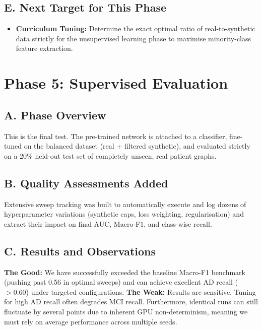\documentclass[11pt, a4paper]{article}
\begin{document}
\subsection{E. Next Target for This Phase}
\begin{itemize}[leftmargin=1.5em]
  \item \textbf{Curriculum Tuning:} Determine the exact optimal ratio of real-to-synthetic data strictly for the unsupervised learning phase to maximise minority-class feature extraction.
\end{itemize}

\section{Phase 5: Supervised Evaluation}

\subsection{A. Phase Overview}
This is the final test. The pre-trained network is attached to a classifier, fine-tuned on the balanced dataset (real + filtered synthetic), and evaluated strictly on a 20\% held-out test set of completely unseen, real patient graphs.

\subsection{B. Quality Assessments Added}
Extensive sweep tracking was built to automatically execute and log dozens of hyperparameter variations (synthetic caps, loss weighting, regularisation) and extract their impact on final AUC, Macro-F1, and class-wise recall.

\subsection{C. Results and Observations}
\textbf{The Good:} We have successfully exceeded the baseline Macro-F1 benchmark (pushing past 0.56 in optimal sweeps) and can achieve excellent AD recall ($>0.60$) under targeted configurations.
\textbf{The Weak:} Results are sensitive. Tuning for high AD recall often degrades MCI recall. Furthermore, identical runs can still fluctuate by several points due to inherent GPU non-determinism, meaning we must rely on average performance across multiple seeds.
\end{document}

